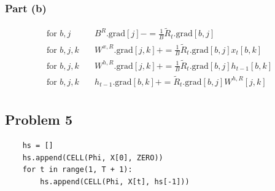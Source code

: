 \documentclass{amsart}
\theoremstyle{definition}
\begin{document}
\subsubsection*{Part (b)}
\begin{align*}
    \text{for } b, j &\quad B^R.\text{grad}[j] -= \frac1{B} \tilde{R}_t.\text{grad}[b, j]\\
    \text{for } b, j, k &\quad W^{x, R}.\text{grad}[j, k] += \frac1{B} \tilde{R}_t.\text{grad}[b, j] x_t[b, k]\\
    \text{for } b, j, k &\quad W^{h, R}.\text{grad}[j, k] += \frac1{B} \tilde{R}_t.\text{grad}[b, j] h_{t-1}[b, k]\\
    \text{for } b, j, k &\quad h_{t-1}.\text{grad}[b, k] +=  \tilde{R}_t.\text{grad}[b, j] W^{h, R}[j, k]\\
\end{align*}

\subsection*{Problem 5}

\begin{verbatim}
    hs = []
    hs.append(CELL(Phi, X[0], ZERO))
    for t in range(1, T + 1):
        hs.append(CELL(Phi, X[t], hs[-1]))
\end{verbatim}
\end{document}
